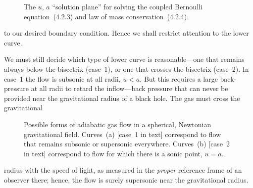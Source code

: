 \begin{figure}[htbp]
\centering
\caption{The $u$, $a$ ``solution plane'' for solving the coupled Bernoulli
equation~(4.2.3) and law of mass conservation~(4.2.4).}
\label{fig:4.2.1}
\end{figure}

to our desired boundary condition.  Hence we shall restrict attention to the
lower curve.

We must still decide which type of lower curve is reasonable---one that
remains always below the bisectrix (case~1), or one that crosses the
bisectrix (case~2).  In case~1 the flow is subsonic at all radii, $u < a$.
But this requires a large back-pressure at all radii to retard the
inflow---back pressure that can never be provided near the gravitational
radius of a black hole.  The gas must cross the gravitational

\begin{figure}[htbp]
\centering
\caption{Possible forms of adiabatic gas flow in a spherical, Newtonian
gravitational field.  Curves~(a) [case~1 in text] correspond to flow that
remains subsonic or supersonic everywhere.  Curves~(b) [case~2 in text]
correspond to flow for which there is a sonic point, $u = a$.}
\label{fig:4.2.2}
\end{figure}

\noindent
radius with the speed of light, as measured in the \emph{proper} reference
frame of an observer there; hence, the flow is surely supersonic near the
gravitational radius.


